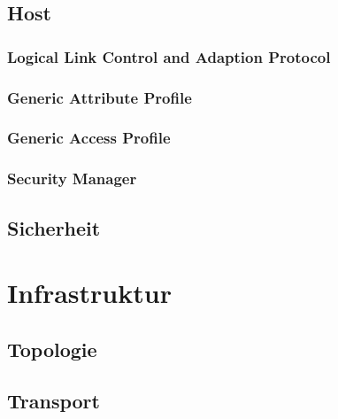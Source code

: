 \documentclass[doktyp=barbeit]{TUBAFarbeiten}
\begin{document}
	\subsection{Host}
		\label{sec: le host}
		

		\subsubsection{Logical Link Control and Adaption Protocol}
			\label{sec: le l2cap}
			

		\subsubsection{Generic Attribute Profile}
			\label{sec: le gatt}
			

		\subsubsection{Generic Access Profile}
			\label{sec: le gap}
			

		\subsubsection{Security Manager}
			\label{sec: le sm}
			

	\subsection{Sicherheit}
		\label{sec: le security}
		

\newpage
\section{Infrastruktur}
	\label{sec: infra allg}
	

	\subsection{Topologie}
		\label{sec: infra topologie}
		

	\subsection{Transport}
		\label{sec: infra transport}
		
\end{document}
